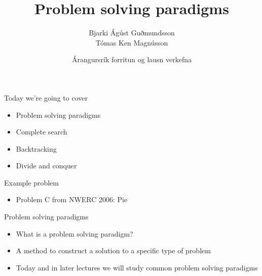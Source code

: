 \documentclass[12pt,t]{beamer}
\title{Problem solving paradigms}
\author{Bjarki Ágúst Guðmundsson \\ Tómas Ken Magnússon}
\institute{\href{http://ru.is/td}{School of Computer Science} \\[2pt] \href{http://ru.is}{Reykjavík University}}
\date{Árangursrík forritun og lausn verkefna}
\newcommand{\bi}{\begin{itemize}}
\newcommand{\ei}{\end{itemize}}
\begin{document}
{
    \frame{
        \titlepage
    }
}


\begin{frame}{Today we're going to cover}
    \vspace{40pt}
    \bi
        \item Problem solving paradigms
        \item Complete search
        \item Backtracking
        \item Divide and conquer
    \ei
\end{frame}

\begin{frame}{Example problem}
    \bi
        \item Problem C from NWERC 2006: Pie
    \ei
\end{frame}

\begin{frame}{Problem solving paradigms}
    \vspace{40pt}
    \bi
        \item What is a problem solving paradigm?
        \item A method to construct a solution to a specific type of problem
        \item Today and in later lectures we will study common problem solving paradigms
    \ei
\end{frame}

\end{document}
